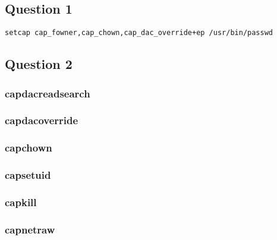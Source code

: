 \documentclass[11pt,letterpaper]{article}
\begin{document}
\subsection*{Question 1}
\label{sec:orgfb5ca81}

\lstset{language=cpp,label= ,caption= ,captionpos=b,numbers=none}
\begin{lstlisting}
setcap cap_fowner,cap_chown,cap_dac_override+ep /usr/bin/passwd
\end{lstlisting}

\subsection*{Question 2}
\label{sec:orgbabc057}

\subsubsection*{capdacreadsearch}
\label{sec:org9926719}
\subsubsection*{capdacoverride}
\label{sec:org999f9fb}
\subsubsection*{capchown}
\label{sec:orgdb0e400}
\subsubsection*{capsetuid}
\label{sec:orgedd9510}
\subsubsection*{capkill}
\label{sec:org4ab7438}
\subsubsection*{capnetraw}
\label{sec:orge30d050}
\end{document}
